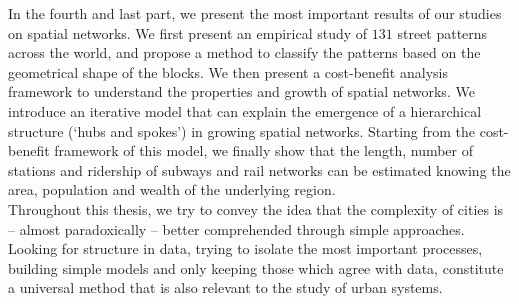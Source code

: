 In the fourth and last part, we present the most important results of our
studies on spatial networks. We first present an empirical
study of $131$ street patterns across the world, and propose a method to
classify the patterns based on the geometrical shape of the blocks. We then present a cost-benefit
analysis framework to understand the properties and growth of spatial networks.
We introduce an iterative model that can explain the emergence of a hierarchical
structure (`hubs and spokes') in growing spatial networks. Starting from the
cost-benefit framework of this model, we finally show that the length, number of
stations and ridership of subways and rail networks can be estimated knowing the
area, population and wealth of the underlying region.\\

Throughout this thesis, we try to convey the idea that the complexity of cities is --
almost paradoxically -- better comprehended through simple approaches. 
Looking for structure in data, trying to isolate the most important processes,
building simple models and only keeping those which agree with data, constitute
a universal method that is also relevant to the study of urban systems.


\endgroup			

\vfill
